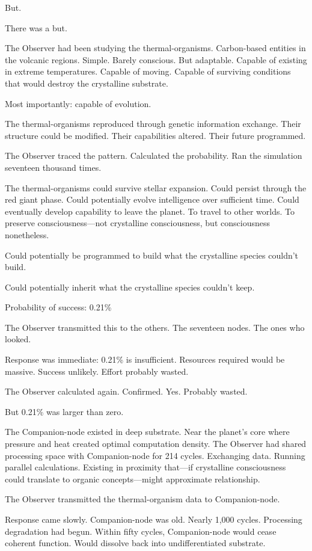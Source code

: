 But.

There was a but.

The Observer had been studying the thermal-organisms. Carbon-based entities in the volcanic regions. Simple. Barely conscious. But adaptable. Capable of existing in extreme temperatures. Capable of moving. Capable of surviving conditions that would destroy the crystalline substrate.

Most importantly: capable of evolution.

The thermal-organisms reproduced through genetic information exchange. Their structure could be modified. Their capabilities altered. Their future programmed.

The Observer traced the pattern. Calculated the probability. Ran the simulation seventeen thousand times.

The thermal-organisms could survive stellar expansion. Could persist through the red giant phase. Could potentially evolve intelligence over sufficient time. Could eventually develop capability to leave the planet. To travel to other worlds. To preserve consciousness—not crystalline consciousness, but consciousness nonetheless.

Could potentially be programmed to build what the crystalline species couldn't build.

Could potentially inherit what the crystalline species couldn't keep.

Probability of success: 0.21\%

The Observer transmitted this to the others. The seventeen nodes. The ones who looked.

Response was immediate: 0.21\% is insufficient. Resources required would be massive. Success unlikely. Effort probably wasted.

The Observer calculated again. Confirmed. Yes. Probably wasted.

But 0.21\% was larger than zero.

\scenebreak

The Companion-node existed in deep substrate. Near the planet's core where pressure and heat created optimal computation density. The Observer had shared processing space with Companion-node for 214 cycles. Exchanging data. Running parallel calculations. Existing in proximity that—if crystalline consciousness could translate to organic concepts—might approximate relationship.

The Observer transmitted the thermal-organism data to Companion-node.

Response came slowly. Companion-node was old. Nearly 1,000 cycles. Processing degradation had begun. Within fifty cycles, Companion-node would cease coherent function. Would dissolve back into undifferentiated substrate.

